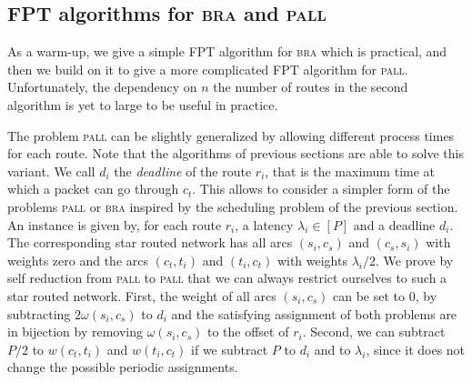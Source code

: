 \documentclass[10pt, conference, letterpaper]{IEEEtran}
\newcommand\pall{\textsc{pall}\xspace}
\newcommand\bra{\textsc{bra}\xspace}
\begin{document}
%   
%     
% 
%     
% 
% 

\subsection{FPT algorithms for \bra and \pall}

As a warm-up, we give a simple FPT algorithm for \bra which is practical,
and then we build on it to give a more complicated FPT algorithm for \pall. Unfortunately, the dependency on $n$ the number of routes
in the second algorithm is yet to large to be useful in practice. 

The problem \pall can be slightly generalized by allowing different process times for each route. Note that the algorithms of previous sections
are able to solve this variant. We call $d_i$ the \emph{deadline} of the route $r_i$, that is the maximum time at which a packet 
can go through $c_t$. This allows to consider a simpler form of the problems \pall or \bra inspired by the scheduling problem of the previous section. An instance is given by, for each route $r_i$, a latency $\lambda_i \in [P]$ and a deadline $d_i$. The corresponding star routed network has all arcs $(s_i,c_s)$ and $(c_s,s_i)$ with weights zero 
and the arcs $(c_t,t_i)$ and $(t_i,c_t)$ with weights $\lambda_i/2$.
We prove by self reduction from \pall to \pall that we can always restrict ourselves to such a star routed network. 
First, the weight of all arcs $(s_i,c_s)$ can be set to $0$, by subtracting $2\omega(s_i,c_s)$ to $d_i$
and the satisfying assignment of both problems are in bijection by removing $\omega(s_i,c_s)$ to the offset of $r_i$. 
Second, we can subtract $P/2$ to $w(c_t,t_i)$ and $w(t_i,c_t)$ if we subtract $P$ to $d_i$ and to $\lambda_i$, 
since it does not change the possible periodic assignments.
\end{document}
